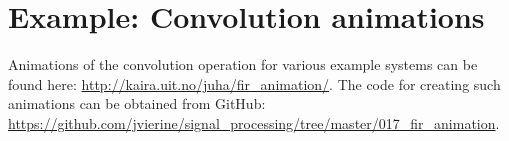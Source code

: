\section{Example: Convolution animations}

Animations of the convolution operation for various example systems
can be found here: \url{http://kaira.uit.no/juha/fir_animation/}. The
code for creating such animations can be obtained from GitHub:
\url{https://github.com/jvierine/signal_processing/tree/master/017_fir_animation}.



